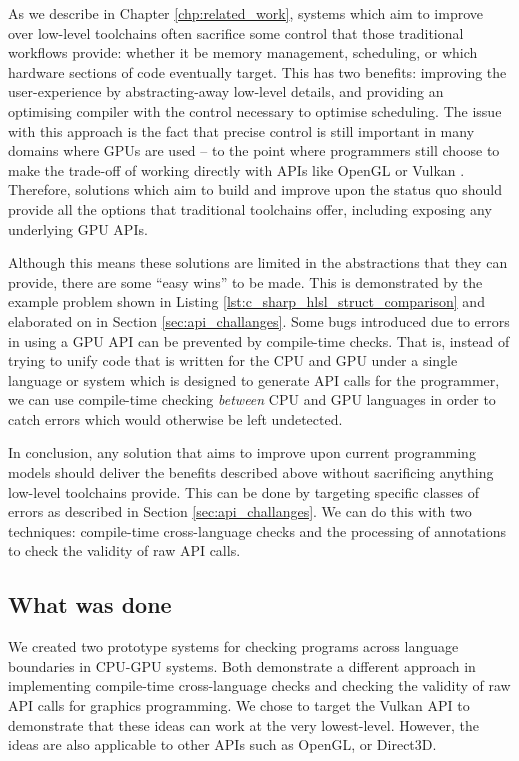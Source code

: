 \documentclass[a4paper,12pt,twoside,openright]{report}
\begin{document}
As we describe in Chapter \ref{chp:related_work}, systems which aim to improve
over low-level toolchains often sacrifice some control that those traditional
workflows provide: whether it be memory management, scheduling, or which
hardware sections of code eventually target. This has two benefits: improving
the user-experience by abstracting-away low-level details, and providing an
optimising compiler with the control necessary to optimise scheduling. The
issue with this approach is the fact that precise control is still important in
many domains where GPUs are used -- to the point where programmers still choose
to make the trade-off of working directly with APIs like OpenGL or Vulkan
\cite{TODO}. Therefore, solutions which aim to build and improve upon the
status quo should provide all the options that traditional toolchains offer,
including exposing any underlying GPU APIs.

Although this means these solutions are limited in the abstractions that they
can provide, there are some ``easy wins'' to be made. This is demonstrated by
the example problem shown in Listing \ref{lst:c_sharp_hlsl_struct_comparison}
and elaborated on in Section \ref{sec:api_challanges}. Some bugs introduced due
to errors in using a GPU API can be prevented by compile-time checks. That is,
instead of trying to unify code that is written for the CPU and GPU under a
single language or system which is designed to generate API calls for the
programmer, we can use compile-time checking \textit{between} CPU and GPU
languages in order to catch errors which would otherwise be left undetected.

In conclusion, any solution that aims to improve upon current programming
models should deliver the benefits described above without sacrificing anything
low-level toolchains provide. This can be done by targeting specific classes of
errors as described in Section \ref{sec:api_challanges}. We can do this with
two techniques: compile-time cross-language checks and the processing of
annotations to check the validity of raw API calls.

\subsection{What was done}

We created two prototype systems for checking programs across language
boundaries in CPU-GPU systems. Both demonstrate a different approach in
implementing compile-time cross-language checks and checking the validity of
raw API calls for graphics programming. We chose to target the Vulkan API to
demonstrate that these ideas can work at the very lowest-level. However, the
ideas are also applicable to other APIs such as OpenGL, or Direct3D.
\end{document}
